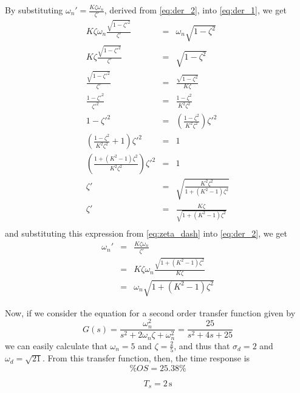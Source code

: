 \documentclass[a4paper, 12pt]{article}
\begin{document}
			By substituting $\omega_n' = \frac{K\zeta\omega_n}{\zeta'}$, derived from \eqref{eq:der_2}, into \eqref{eq:der_1}, we get
			\begin{equation}
				\begin{array}{rcl}
					K\zeta\omega_n \frac{\sqrt{1 - \zeta'^2}}{\zeta'} & = & \omega_n\sqrt{1 - \zeta^2} \\
					K\zeta \frac{\sqrt{1 - \zeta'^2}}{\zeta'} & = & \sqrt{1 - \zeta^2} \\
					\frac{\sqrt{1 - \zeta'^2}}{\zeta'} & = & \frac{\sqrt{1 - \zeta^2}}{K\zeta} \\
					\frac{1 - \zeta'^2}{\zeta'^2} & = & \frac{1 - \zeta^2}{K^2\zeta^2} \\
					1 - \zeta'^2 & = & \left(\frac{1 - \zeta^2}{K^2\zeta^2}\right)\zeta'^2 \\
					\left(\frac{1 - \zeta^2}{K^2\zeta^2} + 1\right) \zeta'^2 & = & 1 \\
					\left(\frac{1 + (K^2 - 1) \zeta^2}{K^2\zeta^2}\right) \zeta'^2 & = & 1 \\
					\zeta' & = & \sqrt{\frac{K^2\zeta^2}{1 + (K^2 - 1) \zeta^2}} \\
					\zeta' & = & \frac{K\zeta}{\sqrt{1 + (K^2 - 1) \zeta^2}} \\
				\end{array}
				\label{eq:zeta_dash}
			\end{equation}
			and substituting this expression from \eqref{eq:zeta_dash} into \eqref{eq:der_2}, we get
			\begin{equation}
				\begin{array}{rcl}
					\omega_n' & = & \frac{K \zeta \omega_n}{\zeta'} \\
					& = & K\zeta\omega_n\frac{\sqrt{1 + (K^2 - 1)\zeta^2}}{K\zeta} \\
					& = & \omega_n\sqrt{1 + (K^2 - 1)\zeta^2}
				\end{array}
				\label{eq:omega_dash}
			\end{equation}

			Now, if we consider the equation for a second order transfer function given by
			\[
				G(s) = \frac{\omega_n^2}{s^2 + 2\omega_n\zeta + \omega_n^2} = \frac{25}{s^2 + 4s + 25}
			\]
			we can easily calculate that $\omega_n = 5$ and $\zeta = \frac{2}{5}$, and thus that $\sigma_d = 2$ and $\omega_d = \sqrt{21}$. From this transfer function, then, the time response is
			\[
				\%OS = 25.38\%
			\]

			\[
				T_s = 2 \,\text{s}
			\]
\end{document}

